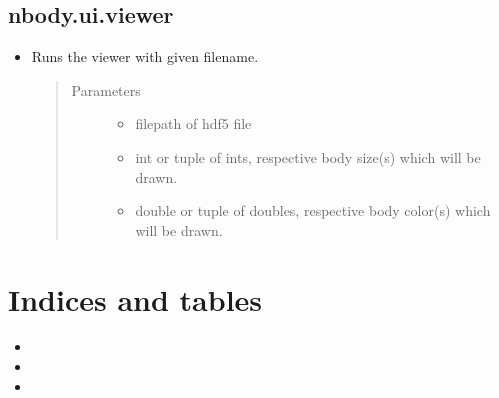 \documentclass[letterpaper,10pt,english]{sphinxmanual}
\begin{document}
\section{nbody.ui.viewer}
\label{\detokenize{viewer:nbody-ui-viewer}}\label{\detokenize{viewer::doc}}\begin{itemize}
\item {} 

\begin{fulllineitems}
\label{\detokenize{viewer:nbody.ui.viewer.run_viewer}}
\sphinxAtStartPar
Runs the viewer with given filename.
\begin{quote}\begin{description}
\item[{Parameters}] \leavevmode\begin{itemize}
\item {} 
\sphinxAtStartPar
{} \textendash{} filepath of hdf5 file

\item {} 
\sphinxAtStartPar
{} \textendash{} int or tuple of ints, respective body size(s) which will be drawn.

\item {} 
\sphinxAtStartPar
{} \textendash{} double or tuple of doubles, respective body color(s) which will be drawn.

\end{itemize}

\end{description}\end{quote}

\end{fulllineitems}


\end{itemize}


\chapter{Indices and tables}
\label{\detokenize{index:indices-and-tables}}\begin{itemize}
\item {} 
\sphinxAtStartPar
{}

\item {} 
\sphinxAtStartPar
{}

\item {} 
\sphinxAtStartPar
{}

\end{itemize}



\renewcommand{\indexname}{Index}
\printindex
\end{document}
